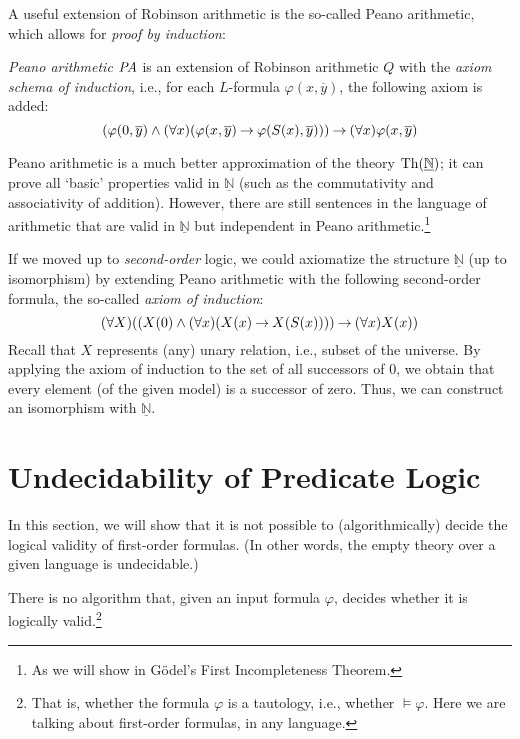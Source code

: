 A useful extension of Robinson arithmetic is the so-called Peano arithmetic, which allows for \emph{proof by induction}:

\begin{definition}
\emph{Peano arithmetic} $\text{\it PA}$ is an extension of Robinson arithmetic $Q$ with the \emph{axiom schema of induction}, i.e., for each $L$-formula $\varphi(x, \overline{y})$, the following axiom is added:
$$
(\varphi(0, \overline{y}) \land (\forall x)(\varphi(x, \overline{y}) \mathbin{\rightarrow} \varphi(S(x), \overline{y}))) \mathbin{\rightarrow} (\forall x)\varphi(x, \overline{y})
$$
\end{definition}

Peano arithmetic is a much better approximation of the theory $\operatorname{Th}(\underline{\mathbb{N}})$; it can prove all `basic' properties valid in $\underline{\mathbb{N}}$ (such as the commutativity and associativity of addition). However, there are still sentences in the language of arithmetic that are valid in $\underline{\mathbb{N}}$ but independent in Peano arithmetic.\footnote{As we will show in Gödel's First Incompleteness Theorem.} 


\begin{remark}
    If we moved up to \emph{second-order} logic, we could axiomatize the structure $\underline{\mathbb N}$ (up to isomorphism) by extending Peano arithmetic with the following second-order formula, the so-called \emph{axiom of induction}:
    $$
    (\forall X)((X(0) \land (\forall x)(X(x) \mathbin{\rightarrow} X(S(x)))) \mathbin{\rightarrow} (\forall x)X(x))
    $$
    Recall that $X$ represents (any) unary relation, i.e., subset of the universe. By applying the axiom of induction to the set of all successors of 0, we obtain that every element (of the given model) is a successor of zero. Thus, we can construct an isomorphism with $\underline{\mathbb N}$.
    \end{remark}
    
    \section{Undecidability of Predicate Logic}
    
    In this section, we will show that it is not possible to (algorithmically) decide the logical validity of first-order formulas. (In other words, the empty theory over a given language is undecidable.)
    
    \begin{theorem}\label{theorem:undecidability-of-predicate-logic}
    There is no algorithm that, given an input formula $\varphi$, decides whether it is logically valid.\footnote{That is, whether the formula $\varphi$ is a tautology, i.e.,  whether $\models\varphi$. Here we are talking about first-order formulas, in any language.}
    \end{theorem}
    
